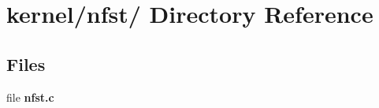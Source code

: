 \hypertarget{dir_000026}{
\section{kernel/nfst/ Directory Reference}
\label{dir_000026}
}
\subsection*{Files}
\begin{CompactItemize}
\item 
file {\bf nfst.c}
\end{CompactItemize}
